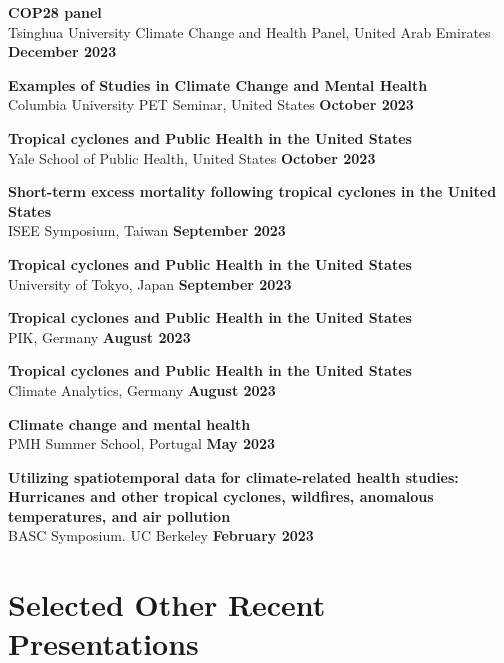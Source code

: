 \noindent \textbf{COP28 panel} \\Tsinghua University Climate Change and Health Panel, United Arab Emirates \hfill \textbf{December 2023} \medskip

\noindent \textbf{Examples of Studies in Climate Change and Mental Health} \\Columbia University PET Seminar, United States \hfill \textbf{October 2023} \medskip

\noindent \textbf{Tropical cyclones and Public Health in the United States} \\Yale School of Public Health, United States \hfill \textbf{October 2023} \medskip

\noindent \textbf{Short-term excess mortality following tropical cyclones in the United States} \\ISEE Symposium, Taiwan \hfill \textbf{September 2023} \medskip

\noindent \textbf{Tropical cyclones and Public Health in the United States} \\University of Tokyo, Japan \hfill \textbf{September 2023} \medskip

\noindent \textbf{Tropical cyclones and Public Health in the United States} \\PIK, Germany  \hfill \textbf{August 2023} \medskip

\noindent \textbf{Tropical cyclones and Public Health in the United States} \\Climate Analytics, Germany \hfill \textbf{August 2023} \medskip

\noindent \textbf{Climate change and mental health} \\PMH Summer School, Portugal \hfill \textbf{May 2023} \medskip

\noindent \textbf{Utilizing spatiotemporal data for climate-related health studies: Hurricanes and other tropical cyclones, wildfires, anomalous temperatures, and air pollution} \\BASC Symposium. UC Berkeley \hfill \textbf{February 2023}

\section*{Selected Other Recent Presentations}


